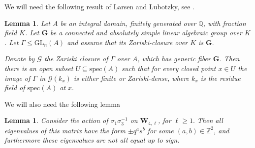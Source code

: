\documentclass[letterpaper]{amsart}
\newtheorem{lemma}[theorem]{Lemma}
\begin{document}
We will need the following result of Larsen and Lubotzky, see \cite[Lemma 4.4]{larsen2011normal}.
\begin{lemma}
\label{Open subset of good specializations}
Let $A$ be an integral domain, finitely generated over $\mathbb{Q}$, with fraction field $K$. Let $\textbf{G}$ be a connected and absolutely simple linear algebraic group over $K$. Let $\Gamma \leq \mathrm{GL}_n(A)$ and assume that its Zariski-closure over $K$ is $\textbf{G}.$

Denote by $\mathcal{G}$ the Zariski closure of $\Gamma$ over $A$, which has generic fiber $\textbf{G}$. Then there is an open subset $U \subseteq \mathrm{spec}(A)$ such that for every closed point $x \in U$ the image of $\Gamma$ in $\mathcal{G}(k_x)$ is either finite or Zariski-dense, where $k_x$ is the residue field of $\mathrm{spec}(A)$ at $x.$
\end{lemma}
We will also need the following lemma
\begin{lemma}
\label{Eigenvalues of sigma1sigma3inv}
Consider the action of $\sigma_1\sigma_3^{-1}$ on $\textbf{W}_{4, \ell}$, for $\ell \geq 1.$ Then all eigenvalues of this matrix have the form $\pm q^as^b$ for some $(a, b) \in \mathbb{Z}^2$, and furthermore these eigenvalues are not all equal up to sign.
\end{lemma}
\end{document}
